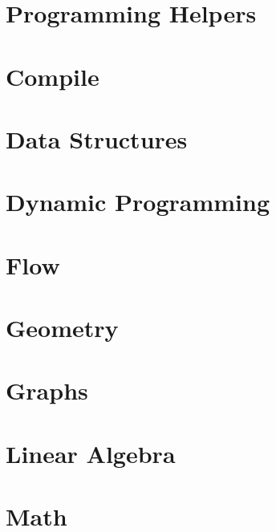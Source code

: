 
\usepackage{needspace}

	\def\title{Equipo 1 Facultad de Ingenieria}
	\tableofcontents\newpage

  \section{Programming Helpers}
  
  
  
  
  

	\section{Compile}
  

  \section{Data Structures}
	

  \section{Dynamic Programming}
  

  \section{Flow}
  

  \section{Geometry}
  

  \section{Graphs}
  

  \section{Linear Algebra}
  

  \section{Math}
  
  
  

